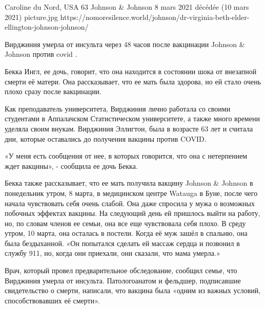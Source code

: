           {Caroline du Nord, USA}
          {63}
          {Johnson \& Johnson}
          {8 mars 2021}
          {décédée (10 mars 2021)}
          {picture.jpg}
          {https://nomoresilence.world/johnson/dr-virginia-beth-elder-ellington-johnson-johnson/}
          {

Вирджиния умерла от инсульта через 48 часов после вакцинации Johnson \& Johnson
против covid .

Бекка Ингл, ее дочь, говорит, что она находится в состоянии шока от внезапной
смерти её матери. Она рассказывает, что ее мать была здорова, но ей стало очень
плохо сразу после вакцинации.

Как преподаватель университета, Вирджиния лично работала со своими студентами в
Аппалачском Статистическом университете, а также много времени уделяла своим
внукам. Вирджиния Эллигтон, была в возрасте 63 лет и считала дни, которые
оставались до получения вакцины против COVID.

«У меня есть сообщения от нее, в которых говорится, что она с нетерпением ждет
вакцины», - сообщила ее дочь Бекка.

Бекка также рассказывает, что ее мать получила вакцину Johnson \& Johnson в
понедельник утром, 8 марта, в медицинском центре Watauga в Буне, после чего
начала чувствовать себя очень слабой. Она даже спросила у мужа о возможных
побочных эффектах вакцины. На следующий день ей пришлось выйти на работу, но, по
словам членов ее семьи, она все еще чувствовала себя плохо. В среду утром, 10
марта, она осталась в постели. Когда её муж зашёл в спальню, она была
бездыханной. «Он попытался сделать ей массаж сердца и позвонил в службу 911, но,
когда они приехали, они сказали, что мама умерла.»

Врач, который провел предварительное обследование, сообщил семье, что Вирджиния
умерла от инсульта. Патологоанатом и фельдшер, подписавшие свидетельство о
смерти, написали, что вакцина была «одним из важных условий, способствовавших её
смерти».

}
